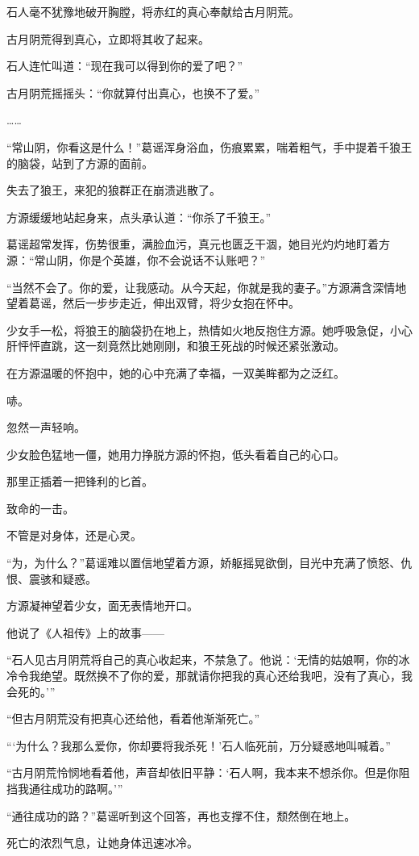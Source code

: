 \begin{this_body}
石人毫不犹豫地破开胸膛，将赤红的真心奉献给古月阴荒。

古月阴荒得到真心，立即将其收了起来。

石人连忙叫道：“现在我可以得到你的爱了吧？”

古月阴荒摇摇头：“你就算付出真心，也换不了爱。”

……

“常山阴，你看这是什么！”葛谣浑身浴血，伤痕累累，喘着粗气，手中提着千狼王的脑袋，站到了方源的面前。

失去了狼王，来犯的狼群正在崩溃逃散了。

方源缓缓地站起身来，点头承认道：“你杀了千狼王。”

葛谣超常发挥，伤势很重，满脸血污，真元也匮乏干涸，她目光灼灼地盯着方源：“常山阴，你是个英雄，你不会说话不认账吧？”

“当然不会了。你的爱，让我感动。从今天起，你就是我的妻子。”方源满含深情地望着葛谣，然后一步步走近，伸出双臂，将少女抱在怀中。

少女手一松，将狼王的脑袋扔在地上，热情如火地反抱住方源。她呼吸急促，小心肝怦怦直跳，这一刻竟然比她刚刚，和狼王死战的时候还紧张激动。

在方源温暖的怀抱中，她的心中充满了幸福，一双美眸都为之泛红。

哧。

忽然一声轻响。

少女脸色猛地一僵，她用力挣脱方源的怀抱，低头看着自己的心口。

那里正插着一把锋利的匕首。

致命的一击。

不管是对身体，还是心灵。

“为，为什么？”葛谣难以置信地望着方源，娇躯摇晃欲倒，目光中充满了愤怒、仇恨、震骇和疑惑。

方源凝神望着少女，面无表情地开口。

他说了《人祖传》上的故事——

“石人见古月阴荒将自己的真心收起来，不禁急了。他说：‘无情的姑娘啊，你的冰冷令我绝望。既然换不了你的爱，那就请你把我的真心还给我吧，没有了真心，我会死的。’”

“但古月阴荒没有把真心还给他，看着他渐渐死亡。”

“‘为什么？我那么爱你，你却要将我杀死！’石人临死前，万分疑惑地叫喊着。”

“古月阴荒怜悯地看着他，声音却依旧平静：‘石人啊，我本来不想杀你。但是你阻挡我通往成功的路啊。’”

“通往成功的路？”葛谣听到这个回答，再也支撑不住，颓然倒在地上。

死亡的浓烈气息，让她身体迅速冰冷。


\end{this_body}
